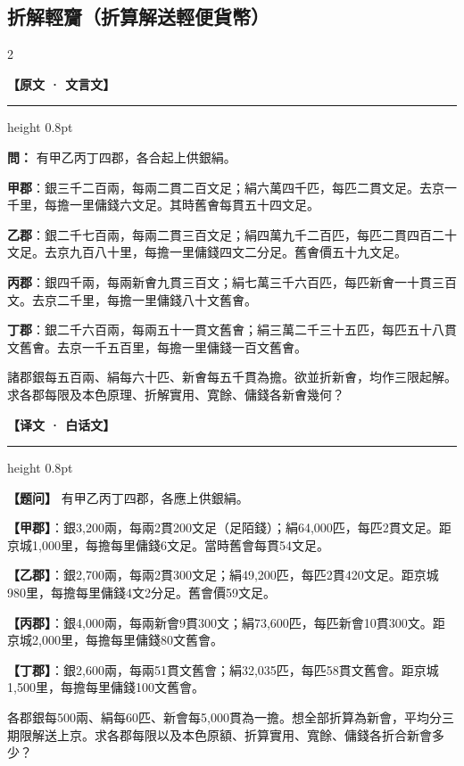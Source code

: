 \documentclass[11pt,a4paper]{article}
\newcommand{\ClassicalQuestion}[1]{\par\noindent\textbf{\color{problemcolor}問：}#1\par}
\newcommand{\ModernQuestion}[1]{\par\noindent\textbf{\color{modernlabel}【题问】}#1\par}
\newcommand{\ClassicalHeader}{%
  \begin{center}\textbf{\color{headerclassical}【原文 · 文言文】}\end{center}
  \vspace{-0.5em}
  \hrule height 0.8pt
  \vspace{0.5em}
}
\newcommand{\ModernHeader}{%
  \begin{center}\textbf{\color{headermodern}【译文 · 白话文】}\end{center}
  \vspace{-0.5em}
  \hrule height 0.8pt
  \vspace{0.5em}
}
\begin{document}
\newpage
\subsection*{\color{sectioncolor}折解輕齎（折算解送輕便貨幣）}

\begin{paracol}{2}

\ClassicalHeader

\ClassicalQuestion{%
有甲乙丙丁四郡，各合起上供銀絹。

\textbf{甲郡}：銀三千二百兩，每兩二貫二百文足；絹六萬四千匹，每匹二貫文足。去京一千里，每擔一里傭錢六文足。其時舊㑹每貫五十四文足。

\textbf{乙郡}：銀二千七百兩，每兩二貫三百文足；絹四萬九千二百匹，每匹二貫四百二十文足。去京九百八十里，每擔一里傭錢四文二分足。舊㑹價五十九文足。

\textbf{丙郡}：銀四千兩，每兩新㑹九貫三百文；絹七萬三千六百匹，每匹新㑹一十貫三百文。去京二千里，每擔一里傭錢八十文舊㑹。

\textbf{丁郡}：銀二千六百兩，每兩五十一貫文舊㑹；絹三萬二千三十五匹，每匹五十八貫文舊㑹。去京一千五百里，每擔一里傭錢一百文舊㑹。

諸郡銀每五百兩、絹每六十匹、新㑹每五千貫為擔。欲並折新㑹，均作三限起解。求各郡每限及本色原理、折解實用、寛餘、傭錢各新㑹幾何？}

\switchcolumn

\ModernHeader

\ModernQuestion{%
有甲乙丙丁四郡，各應上供銀絹。

\textbf{【甲郡】}：銀3,200兩，每兩2貫200文足（足陌錢）；絹64,000匹，每匹2貫文足。距京城1,000里，每擔每里傭錢6文足。當時舊會每貫54文足。

\textbf{【乙郡】}：銀2,700兩，每兩2貫300文足；絹49,200匹，每匹2貫420文足。距京城980里，每擔每里傭錢4文2分足。舊會價59文足。

\textbf{【丙郡】}：銀4,000兩，每兩新會9貫300文；絹73,600匹，每匹新會10貫300文。距京城2,000里，每擔每里傭錢80文舊會。

\textbf{【丁郡】}：銀2,600兩，每兩51貫文舊會；絹32,035匹，每匹58貫文舊會。距京城1,500里，每擔每里傭錢100文舊會。

各郡銀每500兩、絹每60匹、新會每5,000貫為一擔。想全部折算為新會，平均分三期限解送上京。求各郡每限以及本色原額、折算實用、寬餘、傭錢各折合新會多少？
}

\end{paracol}
\end{document}
